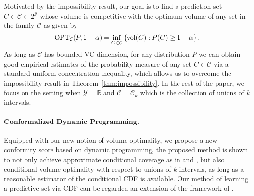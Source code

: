 Motivated by the impossibility result, our goal is to find a prediction set $\widehat{C} \in \mathcal{C}\subset 2^{\mathcal{Y}}$ whose volume is competitive with the optimum volume of any set in the family $\mathcal{C}$ as given by
\begin{equation} \label{eq:intro:optC}
\operatorname{OPT}_{\mathcal{C}}(P, 1-\alpha) = \inf_{C \in \mathcal{C}} \left\{\mathrm{vol}(C) : P(C) \geq 1-\alpha \right\}. 
\end{equation}
As long as $\mathcal{C}$ has bounded VC-dimension, for any distribution $P$ we can obtain good empirical estimates of the probability measure of any set $C \in \mathcal{C}$ via a standard uniform concentration inequality, which allows us to overcome the impossibility result in Theorem~\ref{thm:impossibility}.
In the rest of the paper, we focus on the setting when $\mathcal{Y}=\mathbb{R}$ and $\mathcal{C}= \mathcal{C}_k$ which is the collection of unions of $k$ intervals.






\paragraph{Conformalized Dynamic Programming.}

Equipped with our new notion of volume optimality, we propose a new conformity score based on dynamic programming, the proposed method is shown to not only achieve approximate conditional coverage as in \citep{chernozhukov2021distributional} and \citep{romano2019conformalized}, but also conditional volume optimality with respect to unions of $k$ intervals, as long as a reasonable estimator of the conditional CDF is available. Our method of learning a predictive set via CDF can be regarded an extension of the framework of \cite{izbicki2020flexible,chernozhukov2021distributional}.

